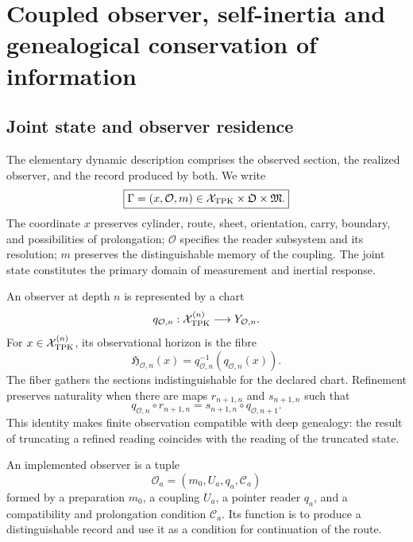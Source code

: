 \chapter{Coupled observer, self-inertia and genealogical conservation of information}
\label{chap:observador-autoinercia-landauer}

\section{Joint state and observer residence}

The elementary dynamic description comprises the observed section, the
realized observer, and the record produced by both. We write
\begin{equation}
 \boxed{\Gamma=(x,\mathcal O,m)\in
 \mathcal X_{\rm TPK}\times\mathfrak O\times\mathfrak M.}
 \label{eq:rm-obs-joint-state}
\end{equation}
The coordinate \(x\) preserves cylinder, route, sheet, orientation, carry,
boundary, and possibilities of prolongation; \(\mathcal O\) specifies the
reader subsystem and its resolution; \(m\) preserves the distinguishable memory
of the coupling. The joint state constitutes the primary domain of
measurement and inertial response.

An observer at depth \(n\) is represented by a chart
\begin{equation}
 q_{\mathcal O,n}:\mathcal X_{\rm TPK}^{(n)}
 \longrightarrow Y_{\mathcal O,n}.
 \label{eq:rm-obs-observer-chart}
\end{equation}
For \(x\in\mathcal X_{\rm TPK}^{(n)}\), its observational horizon is the
fibre
\begin{equation}
 \mathfrak H_{\mathcal O,n}(x)
 =q_{\mathcal O,n}^{-1}(q_{\mathcal O,n}(x)).
 \label{eq:rm-obs-horizon-fiber}
\end{equation}
The fiber gathers the sections indistinguishable for the declared chart.
Refinement preserves naturality when there are maps
\(r_{n+1,n}\) and \(s_{n+1,n}\) such that
\begin{equation}
 q_{\mathcal O,n}\circ r_{n+1,n}
 =s_{n+1,n}\circ q_{\mathcal O,n+1}.
 \label{eq:rm-obs-observer-naturality}
\end{equation}
This identity makes finite observation compatible with deep genealogy:
the result of truncating a refined reading coincides with the
reading of the truncated state.

\begin{definition}
An implemented observer is a tuple
\begin{equation}
 \mathcal O_a=(m_0,U_a,q_a,\mathcal C_a)
 \label{eq:rm-obs-realized-observer}
\end{equation}
formed by a preparation \(m_0\), a coupling \(U_a\), a pointer
reader \(q_a\), and a compatibility and prolongation condition
\(\mathcal C_a\). Its function is to produce a distinguishable record
and use it as a condition for continuation of the route.
\end{definition}

